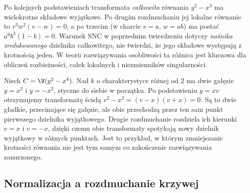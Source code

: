 \begin{uwaga}
Po kolejnych podstawieniach transformata \emph{całkowita}
równania $y^2-x^3$ ma wielokrotne składowe wyjątkowe.
Po drugim rozdmuchaniu jej lokalne równanie to
$v^3w^2(v-w)=0$, a po trzecim (w charcie $v=a$,
$w=ab$) ma postać $a^6b^2(1-b)=0$.
Warunek SNC w poprzednim twierdzeniu dotyczy
\emph{nośnika zredukowanego} dzielnika całkowitego,
nie twierdzi, że jego składowe występują z krotnością jeden.
W teorii rozwiązywania osobliwości ta różnica jest
kluczowa dla obliczeń rozbieżności, całek lokalnych
i niezmienników singularności.
\end{uwaga}

\begin{przyklad}
Niech $C=\V(y^2-x^4)$. Nad $k$ o charakterystyce
różnej od $2$ ma dwie gałęzie $y=x^2$ i $y=-x^2$,
styczne do siebie w początku. Po podstawieniu
$y=xv$ otrzymujemy transformatę ścisłą
$v^2-x^2=(v-x)(v+x)=0$. Są to dwie gładkie,
przecinające się gałęzie, ale obie przechodzą
przez ten sam punkt pierwszego dzielnika wyjątkowego.
Drugie rozdmuchanie rozdziela ich kierunki
$v=x$ i $v=-x$, dzięki czemu obie transformaty
spotykają nowy dzielnik wyjątkowy w różnych punktach.
Jest to przykład, w którym zmniejszanie krotności
równania nie jest tym samym co zakończenie
rozwiązywania zanurzonego.
\end{przyklad}

\subsection{Normalizacja a rozdmuchanie krzywej}


